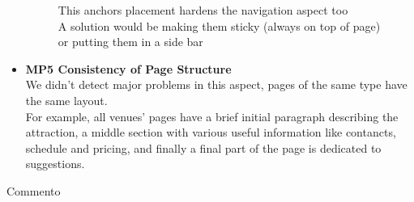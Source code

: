 \begin{itemize}
        \begin{figure}[!ht]
            \begin{minipage}{\linewidth}
                \centering
                \captionsetup{justification=centering}
                \caption{This anchors placement hardens the navigation aspect too\\A solution would be making them sticky (always on top of page) or putting them in a side bar}
                \label{MP4-2}
            \end{minipage}
        \end{figure}
    \item \textbf{MP5 Consistency of Page Structure}\\
        We didn't detect major problems in this aspect, pages of the same type have the same layout.\\
        For example, all venues' pages have a brief initial paragraph describing the attraction, a middle section with various useful information like contancts, schedule and pricing, and finally a final part of the page is dedicated to suggestions. 
\end{itemize}

\pagebreak
Commento